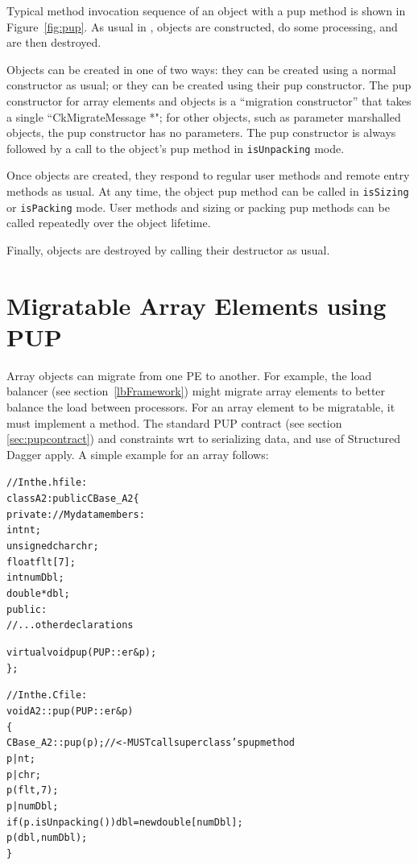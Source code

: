Typical method invocation sequence of an object with a pup method is shown in 
Figure~\ref{fig:pup}.  As usual in \CC{}, objects are 
constructed, do some processing, and are then destroyed.

Objects can be created in one of two ways: they can
be created using a normal constructor as usual; or they
can be created using their pup constructor.  The pup constructor
for \charmpp{} array elements and  objects
is a ``migration constructor'' that takes a single ``CkMigrateMessage *";
for other objects, such as parameter marshalled objects,
the pup constructor has no parameters.  The pup constructor
is always followed by a call to the object's pup method in
\verb.isUnpacking. mode.

Once objects are created, they respond to regular user methods
and remote entry methods as usual.  At any time, the object 
pup method can be called in \verb.isSizing. or \verb.isPacking.
mode.  User methods and sizing or packing pup methods can be called
repeatedly over the object lifetime.

Finally, objects are destroyed by calling their destructor
as usual.


\section{Migratable Array Elements using PUP}

\label{arraymigratable}
Array objects can migrate from one PE to another.  For
example, the load balancer (see section~\ref{lbFramework}) might
migrate array elements to better balance the load between processors.
For an array element to be migratable, it must implement a 
method.  The standard PUP contract (see section \ref{sec:pupcontract})
and constraints wrt to serializing data, and use of Structured Dagger apply.  A simple example for an array follows:

\begin{alltt}
//In the .h file:
class A2 : public CBase\_A2 \{
private: //My data members:
    int nt;
    unsigned char chr;
    float flt[7];
    int numDbl;
    double *dbl;
public:	
    //...other declarations

    virtual void pup(PUP::er \&p);
\};

//In the .C file:
void A2::pup(PUP::er \&p)
\{
    CBase\_A2::pup(p); //<- MUST call superclass's pup method
    p|nt;
    p|chr;
    p(flt,7);
    p|numDbl;
    if (p.isUnpacking()) dbl=new double[numDbl];
    p(dbl,numDbl);
\}
\end{alltt}

